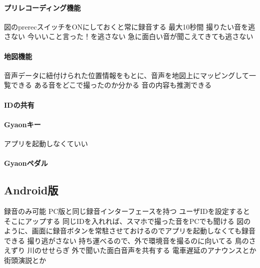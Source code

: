\paragraph{プリレコーディング機能}
    図のprerecスイッチをONにしておくと常に録音する
    最大10秒間
    撮りたい音を逃さない
        今いいこと言った！を逃さない
        急に面白い音が聞こえてきても逃さない

\paragraph{地図機能}
    音声データに紐付けられた位置情報をもとに、音声を地図上にマッピングして一覧できる
    ある音をどこで撮ったのか分かる
        音の内容も推測できる

\paragraph{IDの共有}


\paragraph{Gyaonキー}
    アプリを起動しなくていい

\paragraph{Gyaonペダル}

\subsection{Android版}
録音のみ可能
PC版と同じ録音インターフェースを持つ
ユーザIDを設定するとそこにアップする
同じIDを入れれば、スマホで撮った音をPCでも聞ける
図のように、画面に録音ボタンを常駐させておけるのでアプリを起動しなくても録音できる
撮り逃がさない
持ち運べるので、外で環境音を撮るのに向いてる
    鳥のさえずり
    川のせせらぎ
外で聞いた面白音声を共有する
    電車遅延のアナウンスとか
    街頭演説とか

